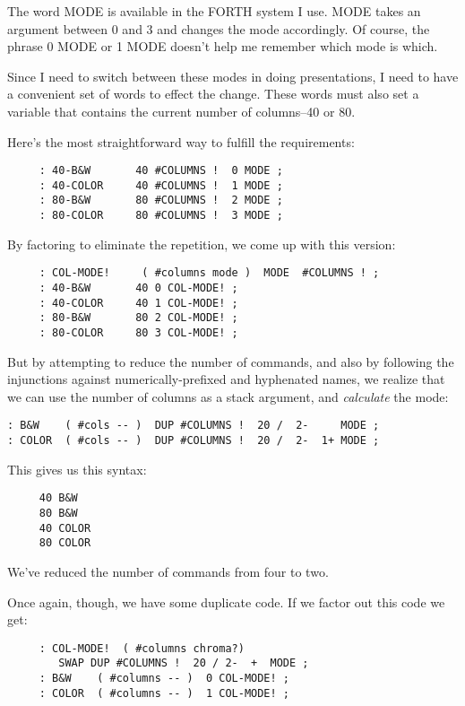 \noindent
The word MODE is available in the FORTH system I use. MODE takes an argument between 0 and 3 and changes the mode accordingly. Of course, the phrase 0 MODE or 1 MODE doesn't help me remember which mode is which.

Since I need to switch between these modes in doing presentations, I need to have a convenient set of words to effect the change. These words must also set a variable that contains the current number of columns--40 or 80.

Here's the most straightforward way to fulfill the requirements:

\begin{verbatim}
     : 40-B&W       40 #COLUMNS !  0 MODE ;
     : 40-COLOR     40 #COLUMNS !  1 MODE ;
     : 80-B&W       80 #COLUMNS !  2 MODE ;
     : 80-COLOR     80 #COLUMNS !  3 MODE ;
\end{verbatim}
By factoring to eliminate the repetition, we come up with this version:

\begin{verbatim}
     : COL-MODE!     ( #columns mode )  MODE  #COLUMNS ! ;
     : 40-B&W       40 0 COL-MODE! ;
     : 40-COLOR     40 1 COL-MODE! ;
     : 80-B&W       80 2 COL-MODE! ;
     : 80-COLOR     80 3 COL-MODE! ;
\end{verbatim}
But by attempting to reduce the number of commands, and also by following the injunctions against numerically-prefixed and hyphenated names, we realize that we can use the number of columns as a stack argument, and \textit{calculate} the mode:

\begin{verbatim}
: B&W    ( #cols -- )  DUP #COLUMNS !  20 /  2-     MODE ;
: COLOR  ( #cols -- )  DUP #COLUMNS !  20 /  2-  1+ MODE ;
\end{verbatim}
This gives us this syntax:

\begin{verbatim}
     40 B&W
     80 B&W
     40 COLOR
     80 COLOR
\end{verbatim}
We've reduced the number of commands from four to two.

Once again, though, we have some duplicate code. If we factor out this code we get:

\begin{verbatim}
     : COL-MODE!  ( #columns chroma?)
        SWAP DUP #COLUMNS !  20 / 2-  +  MODE ;
     : B&W    ( #columns -- )  0 COL-MODE! ;
     : COLOR  ( #columns -- )  1 COL-MODE! ;
\end{verbatim}
     
